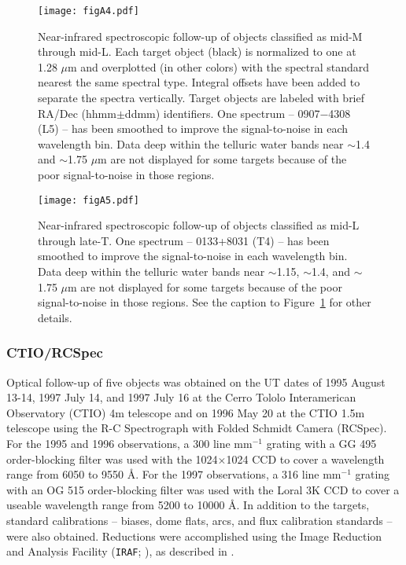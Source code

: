 \documentclass[twocolumn,tighten,twocolappendix]{aastex631}
\begin{document}
\begin{figure*}
\texttt{[image: figA4.pdf]}
\caption{Near-infrared spectroscopic follow-up of objects classified as mid-M through mid-L. Each target object (black) is normalized to one at 1.28 $\mu$m and overplotted (in other colors) with the spectral standard nearest the same spectral type. Integral offsets have been added to separate the spectra vertically. Target objects are labeled with brief RA/Dec (hhmm$\pm$ddmm) identifiers. One spectrum -- 0907$-$4308 (L5) -- has been smoothed to improve the signal-to-noise in each wavelength bin. Data deep within the telluric water bands near $\sim$1.4 and $\sim$1.75 $\mu$m are not displayed for some targets because of the poor signal-to-noise in those regions. 
\label{fig:nir_spec_panel1}}
\end{figure*}

\begin{figure*}
\texttt{[image: figA5.pdf]}
\caption{Near-infrared spectroscopic follow-up of objects classified as mid-L through late-T. One spectrum -- 0133+8031 (T4) -- has been smoothed to improve the signal-to-noise in each wavelength bin. Data deep within the telluric water bands near $\sim$1.15, $\sim$1.4, and $\sim$1.75 $\mu$m are not displayed for some targets because of the poor signal-to-noise in those regions. See the caption to Figure~\ref{fig:nir_spec_panel1} for other details.
\label{fig:nir_spec_panel2}}
\end{figure*}

\subsubsection{CTIO/RCSpec}

Optical follow-up of five objects was obtained on the UT dates of 1995 August 13-14, 1997 July 14, and 1997 July 16 at the Cerro Tololo Interamerican Observatory (CTIO) 4m telescope and on 1996 May 20 at the CTIO 1.5m telescope using the R-C Spectrograph with Folded Schmidt Camera (RCSpec). For the 1995 and 1996 observations, a 300 line mm$^{-1}$ grating with a GG 495 order-blocking filter was used with the 1024$\times$1024 CCD to cover a wavelength range from 6050 to 9550 \AA. For the 1997 observations, a 316 line mm$^{-1}$ grating with an OG 515 order-blocking filter was used with the Loral 3K CCD to cover a useable wavelength range from 5200 to 10000 \AA. In addition to the targets, standard calibrations -- biases, dome flats, arcs, and flux calibration standards -- were also obtained. Reductions were accomplished using the Image Reduction and Analysis Facility (\texttt{IRAF}; \citealt{tody1986,tody1993}), as described in \cite{kirkpatrick1997}.
\end{document}
